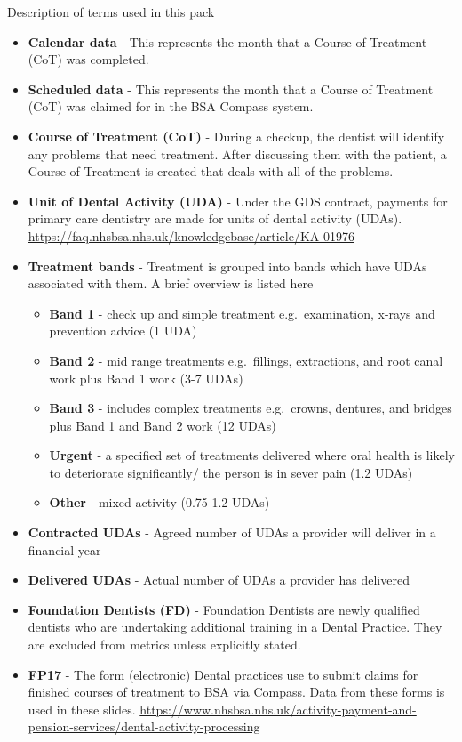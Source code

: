 \documentclass[
  8pt,
  ignorenonframetext,
  aspectratio = 169]{beamer}
\providecommand{\tightlist}{%
  \setlength{\itemsep}{0pt}\setlength{\parskip}{0pt}}
\begin{document}
\begin{frame}{Description of terms used in this pack}
\protect\hypertarget{description-of-terms-used-in-this-pack}{}
\begin{itemize}
\tightlist
\item
  \textbf{Calendar data} - This represents the month that a Course of
  Treatment (CoT) was completed.
\item
  \textbf{Scheduled data} - This represents the month that a Course of
  Treatment (CoT) was claimed for in the BSA Compass system.
\item
  \textbf{Course of Treatment (CoT)} - During a checkup, the dentist
  will identify any problems that need treatment. After discussing them
  with the patient, a Course of Treatment is created that deals with all
  of the problems.
\item
  \textbf{Unit of Dental Activity (UDA)} - Under the GDS contract,
  payments for primary care dentistry are made for units of dental
  activity (UDAs).
  \url{https://faq.nhsbsa.nhs.uk/knowledgebase/article/KA-01976}
\item
  \textbf{Treatment bands} - Treatment is grouped into bands which have
  UDAs associated with them. A brief overview is listed here

  \begin{itemize}
  \tightlist
  \item
    \textbf{Band 1} - check up and simple treatment e.g.~examination,
    x-rays and prevention advice (1 UDA)
  \item
    \textbf{Band 2} - mid range treatments e.g.~fillings, extractions,
    and root canal work plus Band 1 work (3-7 UDAs)
  \item
    \textbf{Band 3} - includes complex treatments e.g.~crowns, dentures,
    and bridges plus Band 1 and Band 2 work (12 UDAs)
  \item
    \textbf{Urgent} - a specified set of treatments delivered where oral
    health is likely to deteriorate significantly/ the person is in
    sever pain (1.2 UDAs)
  \item
    \textbf{Other} - mixed activity (0.75-1.2 UDAs)
  \end{itemize}
\item
  \textbf{Contracted UDAs} - Agreed number of UDAs a provider will
  deliver in a financial year
\item
  \textbf{Delivered UDAs} - Actual number of UDAs a provider has
  delivered
\item
  \textbf{Foundation Dentists (FD)} - Foundation Dentists are newly
  qualified dentists who are undertaking additional training in a Dental
  Practice. They are excluded from metrics unless explicitly stated.
\item
  \textbf{FP17} - The form (electronic) Dental practices use to submit
  claims for finished courses of treatment to BSA via Compass. Data from
  these forms is used in these slides.
  \url{https://www.nhsbsa.nhs.uk/activity-payment-and-pension-services/dental-activity-processing}
\end{itemize}


\end{frame}
\end{document}
